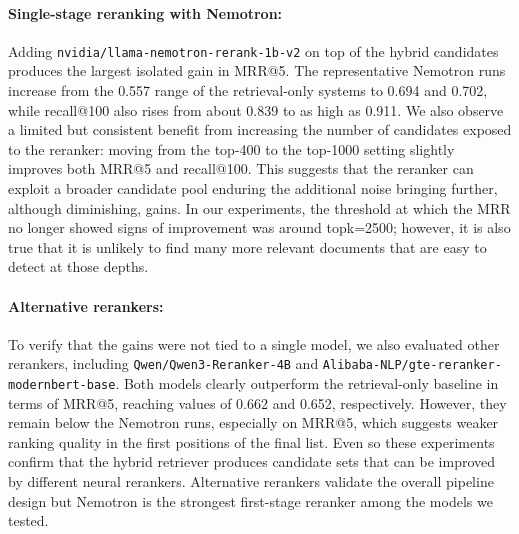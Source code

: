 \paragraph{Single-stage reranking with Nemotron:}
Adding \texttt{nvidia/llama-nemotron-rerank-1b-v2} on top of the hybrid candidates produces the largest isolated gain in MRR@5. The representative Nemotron runs increase from the 0.557 range of the retrieval-only systems to 0.694 and 0.702, while recall@100 also rises from about 0.839 to as high as 0.911. We also observe a limited but consistent benefit from increasing the number of candidates exposed to the reranker: moving from the top-400 to the top-1000 setting slightly improves both MRR@5 and recall@100. This suggests that the reranker can exploit a broader candidate pool enduring the additional noise bringing further, although diminishing, gains. In our experiments, the threshold at which the MRR no longer showed signs of improvement was around topk=2500; however, it is also true that it is unlikely to find many more relevant documents that are easy to detect at those depths.

\paragraph{Alternative rerankers:}
To verify that the gains were not tied to a single model, we also evaluated other rerankers, including \texttt{Qwen/Qwen3-Reranker-4B} and \texttt{Alibaba-NLP/gte-reranker-modernbert-base}. Both models clearly outperform the retrieval-only baseline in terms of MRR@5, reaching values of 0.662 and 0.652, respectively. However, they remain below the Nemotron runs, especially on MRR@5, which suggests weaker ranking quality in the first positions of the final list. Even so these experiments confirm that the hybrid retriever produces candidate sets that can be improved by different neural rerankers. Alternative rerankers validate the overall pipeline design but Nemotron is the strongest first-stage reranker among the models we tested.
